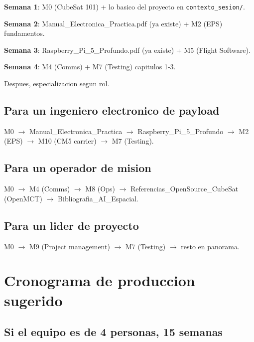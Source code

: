 \documentclass[11pt,a4paper,oneside]{report}
\begin{document}
\textbf{Semana 1}: M0 (CubeSat 101) + lo basico del proyecto en
\texttt{contexto\_sesion/}.

\textbf{Semana 2}: Manual\_Electronica\_Practica.pdf (ya existe) + M2 (EPS)
fundamentos.

\textbf{Semana 3}: Raspberry\_Pi\_5\_Profundo.pdf (ya existe) + M5
(Flight Software).

\textbf{Semana 4}: M4 (Comms) + M7 (Testing) capitulos 1-3.

Despues, especializacion segun rol.

\section{Para un ingeniero electronico de payload}

M0 $\to$ Manual\_Electronica\_Practica $\to$ Raspberry\_Pi\_5\_Profundo $\to$
M2 (EPS) $\to$ M10 (CM5 carrier) $\to$ M7 (Testing).

\section{Para un operador de mision}

M0 $\to$ M4 (Comms) $\to$ M8 (Ops) $\to$ Referencias\_OpenSource\_CubeSat
(OpenMCT) $\to$ Bibliografia\_AI\_Espacial.

\section{Para un lider de proyecto}

M0 $\to$ M9 (Project management) $\to$ M7 (Testing) $\to$ resto en panorama.

\chapter{Cronograma de produccion sugerido}

\section{Si el equipo es de 4 personas, 15 semanas}
\end{document}
